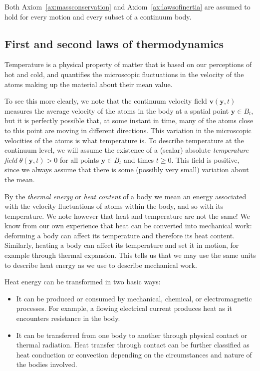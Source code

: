 \documentclass[
  letterpaper,
  DIV=11,
  numbers=noendperiod]{scrreprt}
\theoremstyle{plain}
\theoremstyle{remark}
\begin{document}
Both Axiom~\hyperref[ax:massconservation]{{[}ax:massconservation{]}} and
Axiom~\hyperref[ax:lawsofinertia]{{[}ax:lawsofinertia{]}} are assumed to
hold for every motion and every subset of a continuum body.

\subsection{First and second laws of
thermodynamics}\label{first-and-second-laws-of-thermodynamics}

Temperature is a physical property of matter that is based on our
perceptions of hot and cold, and quantifies the microscopic fluctuations
in the velocity of the atoms making up the material about their mean
value.

To see this more clearly, we note that the continuum velocity field
\({\boldsymbol{v}}({\boldsymbol{y}},t)\) measures the average velocity
of the atoms in the body at a spatial point \({\boldsymbol{y}}\in B_t\),
but it is perfectly possible that, at some instant in time, many of the
atoms close to this point are moving in different directions. This
variation in the microscopic velocities of the atoms is what temperature
is. To describe temperature at the continuum level, we will assume the
existence of a (scalar) absolute \emph{temperature field}
\(\theta({\boldsymbol{y}},t)>0\) for all points
\({\boldsymbol{y}}\in B_t\) and times \(t\geq0\). This field is
positive, since we always assume that there is some (possibly very
small) variation about the mean.

By the \emph{thermal energy} or \emph{heat content} of a body we mean an
energy associated with the velocity fluctuations of atoms within the
body, and so with its temperature. We note however that heat and
temperature are not the same! We know from our own experience that heat
can be converted into mechanical work: deforming a body can affect its
temperature and therefore its heat content. Similarly, heating a body
can affect its temperature and set it in motion, for example through
thermal expansion. This tells us that we may use the same units to
describe heat energy as we use to describe mechanical work.

Heat energy can be transformed in two basic ways:

\begin{itemize}
\item
  It can be produced or consumed by mechanical, chemical, or
  electromagnetic processes. For example, a flowing electrical current
  produces heat as it encounters resistance in the body.
\item
  It can be transferred from one body to another through physical
  contact or thermal radiation. Heat transfer through contact can be
  further classified as heat conduction or convection depending on the
  circumstances and nature of the bodies involved.
\end{itemize}
\end{document}

